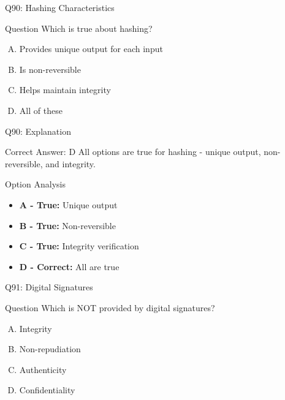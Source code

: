 \documentclass{beamer}
\begin{document}
	\begin{frame}{Q90: Hashing Characteristics}
		\begin{block}{Question}
			Which is true about hashing?
		\end{block}
		\begin{enumerate}[(A)]
			\item Provides unique output for each input
			\item Is non-reversible
			\item Helps maintain integrity
			\item All of these
		\end{enumerate}
	\end{frame}
	
	\begin{frame}{Q90: Explanation}
		\begin{block}{Correct Answer: D}
			All options are true for hashing - unique output, non-reversible, and integrity.
		\end{block}
		\begin{block}{Option Analysis}
			\begin{itemize}
				\item \textbf{A - True:} Unique output
				\item \textbf{B - True:} Non-reversible
				\item \textbf{C - True:} Integrity verification
				\item \textbf{D - Correct:} All are true
			\end{itemize}
		\end{block}
	\end{frame}
	
	\begin{frame}{Q91: Digital Signatures}
		\begin{block}{Question}
			Which is NOT provided by digital signatures?
		\end{block}
		\begin{enumerate}[(A)]
			\item Integrity
			\item Non-repudiation
			\item Authenticity
			\item Confidentiality
		\end{enumerate}
	\end{frame}
	
\end{document}
